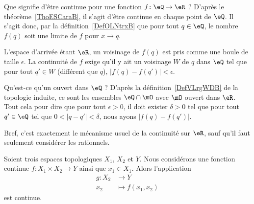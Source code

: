 \begin{example}     \label{EXooHWIIooYYbfGE}
    Que signifie d'être continue pour une fonction \( f\colon \eQ\to \eR\) ? D'après le théorème~\ref{ThoESCaraB}, il s'agit d'être continue en chaque point de \( \eQ\). Il s'agit donc, par la définition~\ref{DefOLNtrxB} que pour tout \( q\in \eQ\), le nombre \( f(q)\) soit une limite de \( f\) pour \( x\to q\).

    L'espace d'arrivée étant \( \eR\), un voisinage de \( f(q)\) est pris comme une boule de taille \( \epsilon\). La continuité de \( f\) exige qu'il y ait un voisinage \( W\) de \( q\) dans \( \eQ\) tel que pour tout \( q'\in W\) (différent que \( q\)), \( | f(q)-f(q') |<\epsilon\).

    Qu'est-ce qu'un ouvert dans \( \eQ\) ? D'après la définition~\ref{DefVLrgWDB} de la topologie induite, ce sont les ensembles \( \eQ\cap\mO\) avec \( \mO\) ouvert dans \( \eR\). Tout cela pour dire que pour tout \( \epsilon>0\), il doit exister \( \delta>0\) tel que pour tout \( q'\in \eQ\) tel que \( 0<| q-q' |<\delta\), nous ayons \( | f(q)-f(q') |\).

    Bref, c'est exactement le mécanisme usuel de la continuité sur \( \eR\), sauf qu'il faut seulement considérer les rationnels.
\end{example}

\begin{lemma}       \label{LEMooHAODooYSPmvH}
    Soient trois espaces topologiques \( X_1\), \( X_2\) et \( Y\). Nous considérons une fonction continue \( f\colon X_1\times X_2\to Y\) ainsi que \( x_1\in X_1\). Alors l'application
    \begin{equation}
        \begin{aligned}
            g\colon X_2&\to Y \\
            x_2&\mapsto f(x_1,x_2)
        \end{aligned}
    \end{equation}
    est continue.
\end{lemma}


